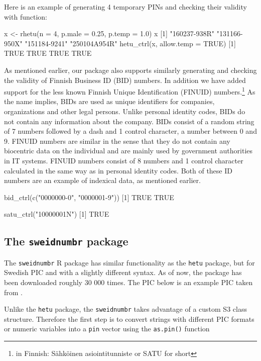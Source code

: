 Here is an example of generating 4 temporary PINs and checking their validity with  function:

\begin{example}
  x <- rhetu(n = 4, p.male = 0.25, p.temp = 1.0)
  x
  [1] "160237-938R" "131166-950X" "151184-9241" "250104A954R"
  hetu_ctrl(x, allow.temp = TRUE)
  [1] TRUE TRUE TRUE TRUE
\end{example}

As mentioned earlier, our package also supports similarly generating and checking the validity of Finnish Business ID (BID) numbers. In addition we have added support for the less known Finnish Unique Identification (FINUID) numbers.\footnote{in Finnish: Sähköinen asiointitunniste or SATU for short} As the name implies, BIDs are used as unique identifiers for companies, organizations and other legal persons. Unlike personal identity codes, BIDs do not contain any information about the company. BIDs consist of a random string of 7 numbers followed by a dash and 1 control character, a number between 0 and 9. FINUID numbers are similar in the sense that they do not contain any biocentric data on the individual and are mainly used by government authorities in IT systems. FINUID numbers consist of 8 numbers and 1 control character calculated in the same way as in personal identity codes. Both of these ID numbers are an example of indexical data, as mentioned earlier.

\begin{example}
  bid_ctrl(c("0000000-0", "0000001-9"))
  [1] TRUE TRUE

  satu_ctrl("10000001N")
  [1] TRUE
\end{example}

\subsection{The \texttt{sweidnumbr} package}

 The \texttt{sweidnumbr} R package has similar functionality as the \texttt{hetu} package, but for Swedish PIC and with a slightly different syntax. As of now, the package has been downloaded roughly 30 000 times. The PIC below is an example PIC taken from \citet{sv2007}.

 Unlike the \texttt{hetu} package, the \texttt{sweidnumbr} takes advantage of a custom S3 class structure. Therefore the first step is to convert strings with different PIC formats or numeric variables into a \texttt{pin} vector using the \texttt{as.pin()} function

